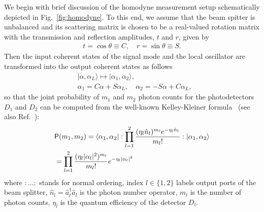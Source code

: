 \documentclass[%
reprint,
superscriptaddress,
 amsmath,amssymb,amsfonts,
 aps,
 pra,
 longbibliography
]{revtex4-2}
\newcommand{\ket}[1]{\ensuremath{|{#1}\rangle}}
\newcommand{\bra}[1]{\ensuremath{\langle{#1}|}}
\newcommand{\hcnj}[1]{{#1}^{\dagger}}
\newcommand{\prob}{\mathsf{P}}
\begin{document}
We begin with brief discussion
of the homodyne measurement setup
schematically depicted in Fig.~\ref{fig:homodyne}.
To this end, we assume that the beam spitter is unbalanced
and its scattering matrix is chosen to be a real-valued
rotation matrix with the transmission and reflection amplitudes,
$t$ and $r$, given by
\begin{align}
  \label{eq:BS-amplitudes}
  t=\cos\theta\equiv C,
  \quad
  r=\sin\theta\equiv S.
\end{align}
Then the input coherent states
of the signal mode and the local oscillator 
are transformed into the output coherent states
as follows
\begin{align}
  \label{eq:BS}
  &
    \ket{\alpha,\alpha_L}\mapsto\ket{\alpha_1,\alpha_2},
  \\
  &
    \label{eq:amplitudes}
    \alpha_1=C\alpha+S\alpha_L,\quad
    \alpha_2=-S\alpha+C\alpha_L,
\end{align}
so that
the joint probability of $m_1$ and $m_2$ photon counts
for the photodetectors $D_1$ and $D_2$
can be computed from the well-known Kelley-Kleiner formula~\cite{Kelley:pr:1964}
(see also Ref.~\cite{Vogel:pra:1993}):
\begin{align}
  &
    \label{eq:1}
    \prob(m_1,m_2)=
    \bra{\alpha_1,\alpha_2}:\prod_{l=1}^{2}\frac{(\eta_l\hat{n}_l)^{m_l}e^{-\eta_l\hat{n}_l}}{m_l!}:\ket{\alpha_1,\alpha_2}
    \notag
  \\
  &
 =\prod_{l=1}^{2}\frac{(\eta_l|\alpha_l|^2)^{m_l}}{m_l!}e^{-\eta_l|\alpha_l|^2}    
\end{align}
where
$:\ldots:$ stands for normal ordering,
index $l\in\{1,2\}$ labels output ports of the beam splitter,
$\hat{n}_l=\hcnj{\hat{a}}_l\hat{a}_l$ is the photon number operator,
$m_l$ is the number of photon counts,
$\eta_l$ is the quantum efficiency of the detector $D_l$.
\end{document}
